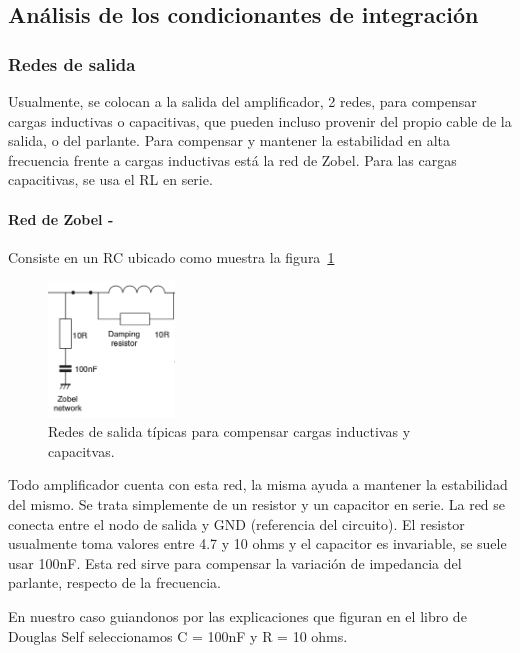 \documentclass[a4paper,12pt,twoside]{article}
\begin{document}
\subsection{Análisis de los condicionantes de integración}


\subsubsection{Redes de salida}

Usualmente, se colocan a la salida del amplificador, 2 redes, para compensar cargas inductivas o capacitivas, que pueden incluso provenir del propio cable de la salida, o del parlante. Para compensar y mantener la estabilidad en alta frecuencia frente a cargas inductivas está la red de Zobel. Para las cargas capacitivas, se usa el RL en serie.

\paragraph{Red de Zobel  -  }

Consiste en un RC ubicado como muestra la figura~\ref{fig:output-networks}

\begin{figure}[H]
\centering
\includegraphics[width=0.3\textwidth]{img/output-networks}
\caption{Redes de salida típicas para compensar cargas inductivas y capacitvas.}
\label{fig:output-networks} 
\end{figure}

Todo amplificador cuenta con esta red, la misma ayuda a mantener la estabilidad del mismo. Se trata simplemente de un resistor y un capacitor
en serie. La red se conecta entre el nodo de salida y GND (referencia del circuito).
El resistor usualmente toma valores entre 4.7 y 10 ohms y el capacitor es invariable, se suele usar 100nF.
Esta red sirve para compensar la variación de impedancia del parlante, respecto de la frecuencia. 

En nuestro caso guiandonos por las explicaciones que figuran en el libro de Douglas Self seleccionamos C = 100nF y R = 10 ohms. 
\end{document}
